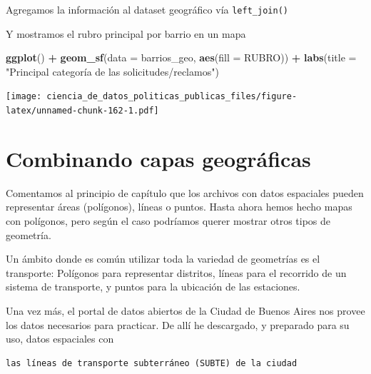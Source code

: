 \documentclass[]{book}
\newenvironment{Shaded}{\begin{snugshade}}{\end{snugshade}}
\newcommand{\KeywordTok}[1]{\textcolor[rgb]{0.13,0.29,0.53}{\textbf{#1}}}
\newcommand{\DataTypeTok}[1]{\textcolor[rgb]{0.13,0.29,0.53}{#1}}
\newcommand{\StringTok}[1]{\textcolor[rgb]{0.31,0.60,0.02}{#1}}
\newcommand{\OperatorTok}[1]{\textcolor[rgb]{0.81,0.36,0.00}{\textbf{#1}}}
\newcommand{\NormalTok}[1]{#1}
\begin{document}
Agregamos la información al dataset geográfico vía \texttt{left\_join()}

\begin{Shaded}
\end{Shaded}

Y mostramos el rubro principal por barrio en un mapa

\begin{Shaded}
\begin{Highlighting}[]
\KeywordTok{ggplot}\NormalTok{() }\OperatorTok{+}\StringTok{ }
\StringTok{    }\KeywordTok{geom_sf}\NormalTok{(}\DataTypeTok{data =}\NormalTok{ barrios_geo, }\KeywordTok{aes}\NormalTok{(}\DataTypeTok{fill =}\NormalTok{ RUBRO)) }\OperatorTok{+}
\StringTok{    }\KeywordTok{labs}\NormalTok{(}\DataTypeTok{title =} \StringTok{"Principal categoría de las solicitudes/reclamos"}\NormalTok{)}
\end{Highlighting}
\end{Shaded}

\texttt{[image: ciencia\_de\_datos\_politicas\_publicas\_files/figure-latex/unnamed-chunk-162-1.pdf]}

\section{Combinando capas
geográficas}\label{combinando-capas-geograficas}

Comentamos al principio de capítulo que los archivos con datos
espaciales pueden representar áreas (polígonos), líneas o puntos. Hasta
ahora hemos hecho mapas con polígonos, pero según el caso podríamos
querer mostrar otros tipos de geometría.

Un ámbito donde es común utilizar toda la variedad de geometrías es el
transporte: Polígonos para representar distritos, líneas para el
recorrido de un sistema de transporte, y puntos para la ubicación de las
estaciones.

Una vez más, el portal de datos abiertos de la Ciudad de Buenos Aires
nos provee los datos necesarios para practicar. De allí he descargado, y
preparado para su uso, datos espaciales con

\begin{verbatim}
las líneas de transporte subterráneo (SUBTE) de la ciudad
\end{verbatim}
\end{document}
